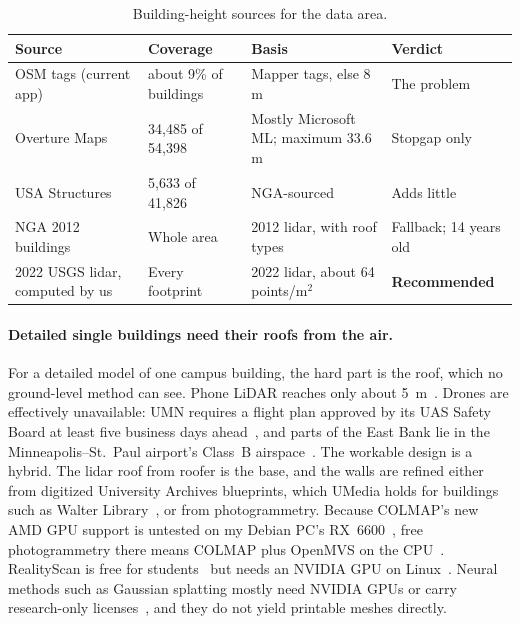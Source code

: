 \documentclass[11pt,letterpaper]{article}
\begin{document}
\begin{table}[!htbp]
  \centering
  \caption{Building-height sources for the data area.}
  \label{tab:heights}
  \begin{tabularx}{\textwidth}{@{}P{0.25\textwidth}P{0.17\textwidth}LP{0.17\textwidth}@{}}
    \toprule
    Source & Coverage & Basis & Verdict \\
    \midrule
    OSM tags (current app) & about 9\% of buildings & Mapper tags, else 8 m & The problem \\
    Overture Maps~\cite{overture} & 34,485 of 54,398 & Mostly Microsoft ML; maximum 33.6 m & Stopgap only \\
    USA Structures~\cite{usastructures} & 5,633 of 41,826 & NGA-sourced & Adds little \\
    NGA 2012 buildings~\cite{nga2012} & Whole area & 2012 lidar, with roof types & Fallback; 14 years old \\
    2022 USGS lidar, computed by us & Every footprint & 2022 lidar, about 64 points/m$^2$ & \textbf{Recommended} \\
    \bottomrule
  \end{tabularx}
\end{table}

\paragraph{Detailed single buildings need their roofs from the air.} For a detailed model of one campus building, the hard part is the roof, which no ground-level method can see. Phone LiDAR reaches only about 5~m~\cite{ipadlidar}. Drones are effectively unavailable: UMN requires a flight plan approved by its UAS Safety Board at least five business days ahead~\cite{umndrones}, and parts of the East Bank lie in the Minneapolis--St.~Paul airport's Class~B airspace~\cite{faaclassb}. The workable design is a hybrid. The lidar roof from roofer is the base, and the walls are refined either from digitized University Archives blueprints, which UMedia holds for buildings such as Walter Library~\cite{umedia}, or from photogrammetry. Because COLMAP's new AMD GPU support is untested on my Debian PC's RX~6600~\cite{colmap}, free photogrammetry there means COLMAP plus OpenMVS on the CPU~\cite{openmvs}. RealityScan is free for students~\cite{rslicense} but needs an NVIDIA GPU on Linux~\cite{rslinux}. Neural methods such as Gaussian splatting mostly need NVIDIA GPUs or carry research-only licenses~\cite{nerfstudio,gslicense}, and they do not yield printable meshes directly.
\end{document}
